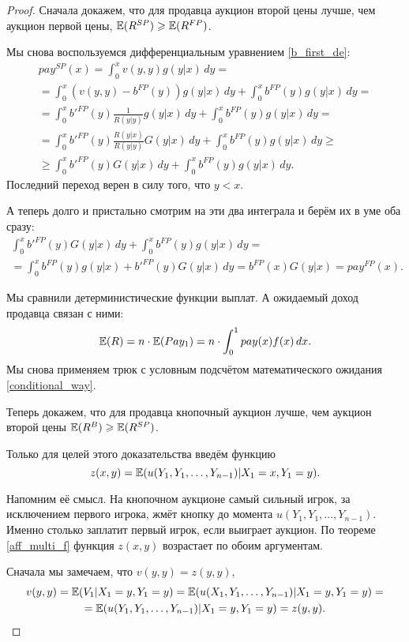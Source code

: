 \begin{proof}
Сначала докажем, что для продавца аукцион второй цены лучше, чем аукцион первой цены, $\operatorname{\mathbb{E}}(R^{SP})\geqslant \operatorname{\mathbb{E}}(R^{FP})$.


Мы снова воспользуемся дифференциальным уравнением \ref{b_first_de}:
\begin{multline}
pay^{SP}(x)=\int_{0}^{x}v(y,y)g(y|x) \, dy=\\
=\int_{0}^{x}(v(y,y)-b^{FP}(y))g(y|x) \, dy+\int_{0}^{x}b^{FP}(y)g(y|x) \, dy=\\
=\int_{0}^{x}b'^{FP}(y)\frac{1}{R(y|y)}g(y|x) \, dy+\int_{0}^{x}b^{FP}(y)g(y|x) \, dy=\\
=\int_{0}^{x}b'^{FP}(y)\frac{R(y|x)}{R(y|y)}G(y|x) \, dy+\int_{0}^{x}b^{FP}(y)g(y|x) \, dy\geq\\
\geq \int_{0}^{x}b'^{FP}(y)G(y|x) \, dy+\int_{0}^{x}b^{FP}(y)g(y|x) \, dy.
\end{multline}
Последний переход верен в силу того, что $ y<x $.

А теперь долго и пристально смотрим на эти два интеграла и берём их в уме оба сразу:
\begin{multline}
\int_{0}^{x}b'^{FP}(y)G(y|x) \, dy+\int_{0}^{x}b^{FP}(y)g(y|x) \, dy=\\
=\int_{0}^{x}b^{FP}(y)g(y|x)+b'^{FP}(y)G(y|x) \, dy=
b^{FP}(x)G(y|x)=pay^{FP}(x).
\end{multline}

Мы сравнили детерминистические функции выплат. А ожидаемый доход продавца связан с ними:
\begin{equation}
\operatorname{\mathbb{E}}(R)=n\cdot \operatorname{\mathbb{E}}(Pay_{1})=n\cdot \int_{0}^{1}pay(x)f(x) \, dx.
\end{equation}
Мы снова применяем трюк с условным подсчётом математического ожидания \ref{conditional_way}.

Теперь докажем, что для продавца кнопочный аукцион лучше, чем аукцион второй цены $ \operatorname{\mathbb{E}}(R^{B})\geqslant \operatorname{\mathbb{E}}(R^{SP}) $.

Только для целей этого доказательства введём функцию
\[
z(x,y)=\operatorname{\mathbb{E}}(u(Y_{1},Y_{1},\ldots,Y_{n-1})|X_{1}=x,Y_{1}=y).
\]

Напомним её смысл. На кнопочном аукционе самый сильный игрок, за исключением первого игрока, жмёт кнопку до момента $ u(Y_{1},Y_{1},\ldots,Y_{n-1}) $. Именно столько заплатит первый игрок, если выиграет аукцион. По теореме \ref{aff_multi_f} функция $ z(x,y) $ возрастает по обоим аргументам.

Сначала мы замечаем, что $ v(y,y)=z(y,y) $,
\begin{multline}
v(y,y)=\operatorname{\mathbb{E}}(V_{1}|X_{1}=y, Y_{1}=y)=\operatorname{\mathbb{E}}(u(X_{1},Y_{1},\ldots,Y_{n-1})|X_{1}=y, Y_{1}=y)=\\
=\operatorname{\mathbb{E}}(u(Y_{1},Y_{1},\ldots,Y_{n-1})|X_{1}=y, Y_{1}=y)=z(y,y).
\end{multline}


\end{proof}

